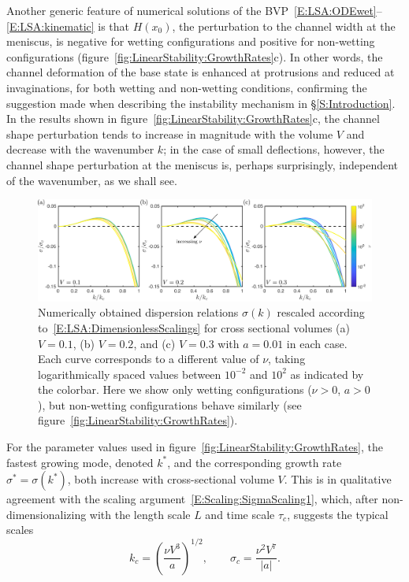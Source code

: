 \documentclass{jfm}
\newcommand{\aspect}{a} %
\begin{document}
Another generic feature of numerical solutions of the BVP~\eqref{E:LSA:ODEwet}--\eqref{E:LSA:kinematic} is that $H(x_0)$, the perturbation to the channel width at the meniscus, is negative for wetting configurations and positive for non-wetting configurations (figure~\ref{fig:LinearStability:GrowthRates}c). In other words, the channel deformation of the base state is enhanced at protrusions and reduced at invaginations, for both wetting and non-wetting conditions, confirming the suggestion made when describing the instability mechanism in \S\ref{S:Introduction}. In the results shown in figure~\ref{fig:LinearStability:GrowthRates}c, the channel shape perturbation tends to increase in magnitude with the volume $V$ and decrease with the wavenumber $k$; in the case of small deflections, however, the channel shape perturbation at the meniscus is, perhaps surprisingly, independent of the wavenumber, as we shall see. 

\begin{figure}
\centering
\includegraphics[width = \textwidth]{figures/fig7_rescaled_growth_rates.pdf}
\caption{Numerically obtained dispersion relations $\sigma(k)$ rescaled according to~\eqref{E:LSA:DimensionlessScalings} for cross sectional volumes (a) $V = 0.1$, (b) $V = 0.2$, and (c) $V = 0.3$ with $\aspect = 0.01$ in each case. Each curve corresponds to a different value of $\nu$, taking logarithmically spaced values between $10^{-2}$ and $10^{2}$ as indicated by the colorbar. Here we show only wetting configurations ($\nu >0$, $a >0$), but non-wetting configurations behave similarly (see figure~\ref{fig:LinearStability:GrowthRates}). }
\label{fig:RescaledGrowthRates}
\end{figure}

For the parameter values used in figure~\ref{fig:LinearStability:GrowthRates}, the fastest growing mode, denoted $k^*$, and the corresponding growth rate $\sigma^* = \sigma(k^*)$, both increase with cross-sectional volume $V$. This is in qualitative agreement with the scaling argument~\eqref{E:Scaling:SigmaScaling1}, which, after non-dimensionalizing with the length scale $L$ and time scale $\tau_c$, suggests the typical scales
\begin{equation}\label{E:LSA:DimensionlessScalings}
k_c  = \left(\frac{\nu V^3}{a}\right)^{1/2}, \qquad \sigma_c = \frac{\nu^2 V^7}{|a|}.
\end{equation}
\end{document}
